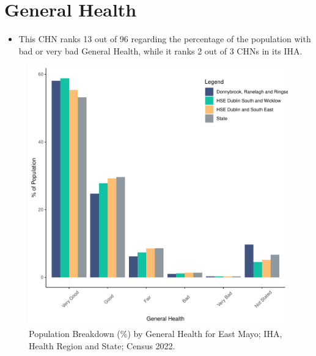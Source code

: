 \documentclass{article}
\begin{document}
\pagebreak

\section{General Health}\label{sect:GenHealth}
\begin{itemize}
\item  This CHN ranks  13 out of 96 regarding the percentage of the population with bad or very bad General Health, while it ranks   2 out of 3 CHNs in its IHA.
\end{itemize}
\begin{figure}[h]
	\centering
	\includegraphics[width = 150mm]{../figures/GenED.pdf}
	\caption{Population Breakdown (\%) by General Health for East Mayo; IHA, Health Region and State;  Census 2022.}
	\label{fig:2ae19629-1a6a-13a3-e055-000000000001}
	\end{figure}
\end{document}
